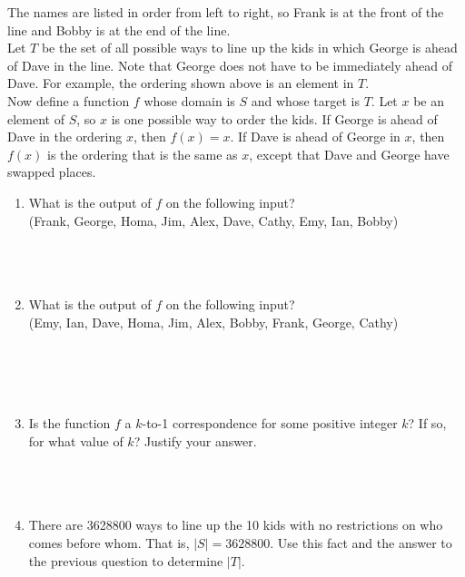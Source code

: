 \documentclass{amsart}
\theoremstyle{definition}
\theoremstyle{Exercise}
\theoremstyle{remark}
\theoremstyle{rule}
\numberwithin{equation}{section}
\begin{document}
The names are listed in order from left to right, so Frank is at the front of the line and Bobby is at the end of the line.\\

Let $T$ be the set of all possible ways to line up the kids in which George is ahead of Dave in the line. Note that George does not have to be immediately ahead of Dave. For example, the ordering shown above is an element in $T$.\\

Now define a function $f$ whose domain is $S$ and whose target is $T$. Let $x$ be an element of $S$, so $x$ is one possible way to order the kids. If George is ahead of Dave in the ordering $x$, then $f(x) = x$. If Dave is ahead of George in $x$, then $f(x)$ is the ordering that is the same as $x$, except that Dave and George have swapped places.\\
\begin{enumerate}[label=(\alph*)]
  \item What is the output of $f$ on the following input?\\
  (Frank, George, Homa, Jim, Alex, Dave, Cathy, Emy, Ian, Bobby)\\\\
\\\\
  \item What is the output of $f$ on the following input?\\
(Emy, Ian, Dave, Homa, Jim, Alex, Bobby, Frank, George, Cathy)\\\\
\\\\\
  \item Is the function $f$ a $k$-to-1 correspondence for some positive integer $k$? If so, for what value of $k$? Justify your answer.\\\\
\\\\
  \item There are 3628800 ways to line up the 10 kids with no restrictions on who comes before whom. That is, $|S| =3628800$. Use this fact and the answer to the previous question to determine $|T|$.\\\\
\\\\
\end{enumerate}
\end{document}
